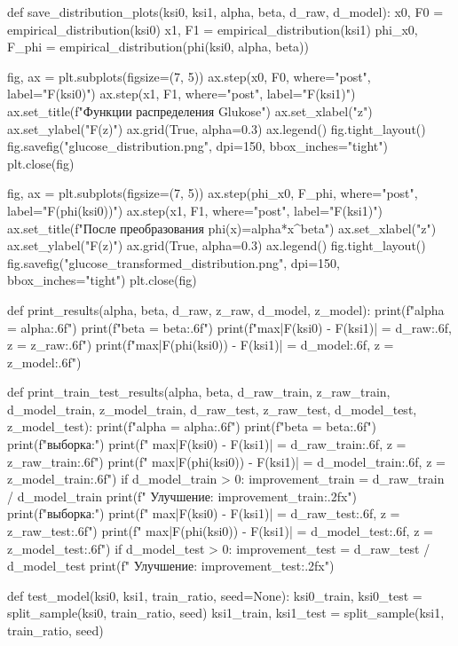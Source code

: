 \documentclass[a4paper, 14pt]{extarticle}
\begin{document}
\begin{breakablelisting}
def save_distribution_plots(ksi0, ksi1, alpha, beta, d_raw, d_model):
    x0, F0 = empirical_distribution(ksi0)
    x1, F1 = empirical_distribution(ksi1)
    phi_x0, F_phi = empirical_distribution(phi(ksi0, alpha, beta))

    fig, ax = plt.subplots(figsize=(7, 5))
    ax.step(x0, F0, where="post", label="F(ksi0)")
    ax.step(x1, F1, where="post", label="F(ksi1)")
    ax.set_title(f"Функции распределения Glukose")
    ax.set_xlabel("z")
    ax.set_ylabel("F(z)")
    ax.grid(True, alpha=0.3)
    ax.legend()
    fig.tight_layout()
    fig.savefig("glucose_distribution.png", dpi=150, bbox_inches="tight")
    plt.close(fig)

    fig, ax = plt.subplots(figsize=(7, 5))
    ax.step(phi_x0, F_phi, where="post", label="F(phi(ksi0))")
    ax.step(x1, F1, where="post", label="F(ksi1)")
    ax.set_title(f"После преобразования phi(x)=alpha*x^beta")
    ax.set_xlabel("z")
    ax.set_ylabel("F(z)")
    ax.grid(True, alpha=0.3)
    ax.legend()
    fig.tight_layout()
    fig.savefig("glucose_transformed_distribution.png", dpi=150, bbox_inches="tight")
    plt.close(fig)


def print_results(alpha, beta, d_raw, z_raw, d_model, z_model):
    print(f"alpha = {alpha:.6f}")
    print(f"beta = {beta:.6f}")
    print(f"max|F(ksi0) - F(ksi1)| = {d_raw:.6f}, z = {z_raw:.6f}")
    print(f"max|F(phi(ksi0)) - F(ksi1)| = {d_model:.6f}, z = {z_model:.6f}")


def print_train_test_results(alpha, beta, d_raw_train, z_raw_train, d_model_train, z_model_train,
                              d_raw_test, z_raw_test, d_model_test, z_model_test):
    print(f"alpha = {alpha:.6f}")
    print(f"beta = {beta:.6f}")
    print(f" выборка:")
    print(f"  max|F(ksi0) - F(ksi1)| = {d_raw_train:.6f}, z = {z_raw_train:.6f}")
    print(f"  max|F(phi(ksi0)) - F(ksi1)| = {d_model_train:.6f}, z = {z_model_train:.6f}")
    if d_model_train > 0:
        improvement_train = d_raw_train / d_model_train
        print(f"  Улучшение: {improvement_train:.2f}x")
    print(f" выборка:")
    print(f"  max|F(ksi0) - F(ksi1)| = {d_raw_test:.6f}, z = {z_raw_test:.6f}")
    print(f"  max|F(phi(ksi0)) - F(ksi1)| = {d_model_test:.6f}, z = {z_model_test:.6f}")
    if d_model_test > 0:
        improvement_test = d_raw_test / d_model_test
        print(f"  Улучшение: {improvement_test:.2f}x")


def test_model(ksi0, ksi1, train_ratio, seed=None):
    ksi0_train, ksi0_test = split_sample(ksi0, train_ratio, seed)
    ksi1_train, ksi1_test = split_sample(ksi1, train_ratio, seed)
    

\end{breakablelisting}
\end{document}
